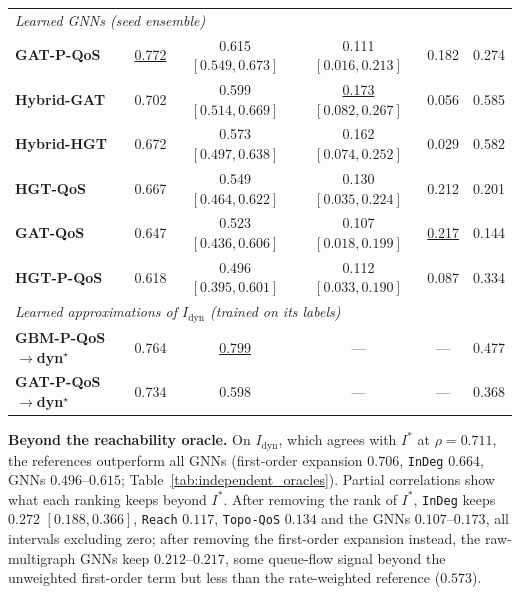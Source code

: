 \begin{table}[htbp]
{\begin{tabular}{lccccc}
\midrule
\multicolumn{6}{l}{\textit{Learned GNNs (seed ensemble)}} \\
\textbf{GAT-P-QoS} & \underline{0.772} & 0.615 $[0.549, 0.673]$ & 0.111 $[0.016, 0.213]$ & 0.182 & 0.274 \\
\textbf{Hybrid-GAT} & 0.702 & 0.599 $[0.514, 0.669]$ & \underline{0.173} $[0.082, 0.267]$ & 0.056 & 0.585 \\
\textbf{Hybrid-HGT} & 0.672 & 0.573 $[0.497, 0.638]$ & 0.162 $[0.074, 0.252]$ & 0.029 & 0.582 \\
\textbf{HGT-QoS} & 0.667 & 0.549 $[0.464, 0.622]$ & 0.130 $[0.035, 0.224]$ & 0.212 & 0.201 \\
\textbf{GAT-QoS} & 0.647 & 0.523 $[0.436, 0.606]$ & 0.107 $[0.018, 0.199]$ & \underline{0.217} & 0.144 \\
\textbf{HGT-P-QoS} & 0.618 & 0.496 $[0.395, 0.601]$ & 0.112 $[0.033, 0.190]$ & 0.087 & 0.334 \\
\midrule
\multicolumn{6}{l}{\textit{Learned approximations of $I_{\text{dyn}}$ (trained on its labels)}} \\
\textbf{GBM-P-QoS$\to$dyn$^\star$} & 0.764 & \underline{0.799} & --- & --- & 0.477 \\
\textbf{GAT-P-QoS$\to$dyn$^\star$} & 0.734 & 0.598 & --- & --- & 0.368 \\
\bottomrule
\end{tabular}%
}
\end{table}

\noindent\textbf{Beyond the reachability oracle.} On $I_{\text{dyn}}$, which agrees with $I^*$ at $\rho = 0.711$, the references outperform all GNNs (first-order expansion $0.706$, \texttt{InDeg} $0.664$, GNNs $0.496$--$0.615$; Table~\ref{tab:independent_oracles}). Partial correlations show what each ranking keeps beyond $I^*$. After removing the rank of $I^*$, \texttt{InDeg} keeps $0.272$ $[0.188, 0.366]$, \texttt{Reach} $0.117$, \texttt{Topo-QoS} $0.134$ and the GNNs $0.107$--$0.173$, all intervals excluding zero; after removing the first-order expansion instead, the raw-multigraph GNNs keep $0.212$--$0.217$, some queue-flow signal beyond the unweighted first-order term but less than the rate-weighted reference ($0.573$).

